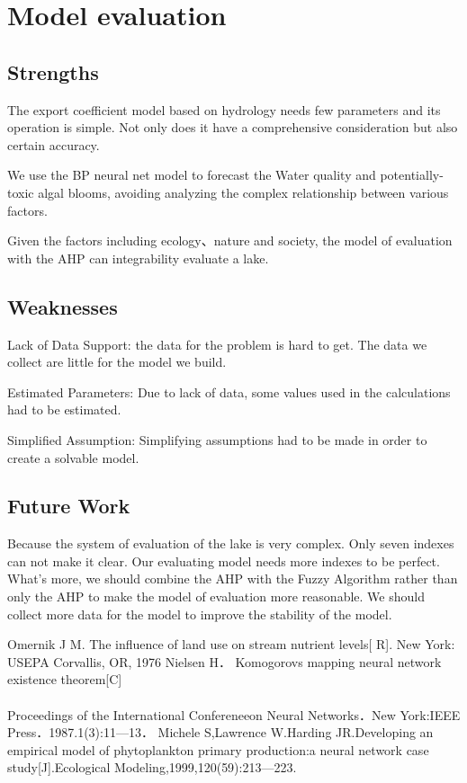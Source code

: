 \documentclass[12pt,a4paper]{article}
\begin{document}
\section{Model evaluation}
\subsection{Strengths}
The export coefficient model based on hydrology needs few parameters and its operation is simple. Not only does it have a comprehensive consideration but also certain accuracy.\par
We use the BP neural net model to forecast the Water quality and potentially-toxic algal blooms, avoiding analyzing the complex relationship between various factors.\par
Given the factors including ecology、nature and society, the model of evaluation with the AHP can integrability evaluate a lake.\par
\subsection{Weaknesses}
Lack of Data Support: the data for the problem is hard to get. The data we collect are little for the model we build.\par
Estimated Parameters: Due to lack of data, some values used in the calculations had to be estimated.\par
Simplified Assumption: Simplifying assumptions had to be made in order to create a solvable model.\par
\subsection{Future Work}
Because the system of evaluation of the lake is very complex. Only seven indexes can not make it clear. Our evaluating model needs more indexes to be perfect. What's more, we should combine the AHP with the Fuzzy Algorithm rather than only the AHP to make the model of evaluation more reasonable. We should collect more data for the model to improve the stability of the model.\par

\newpage
\begin{thebibliography}{99}
     Omernik J M. The influence of land use on stream nutrient levels[ R]. New York: USEPA Corvallis, OR, 1976\label{1}
    Nielsen H． Komogorovs mapping neural network existence theorem[C]\\\\Proceedings of the International Confereneeon Neural Networks．New York:IEEE Press．1987.1(3):11—13．\label{2}
    Michele S,Lawrence W.Harding JR.Developing an empirical model of phytoplankton primary production:a neural network case study[J].Ecological Modeling,1999,120(59):213—223. \label{3}
    
\end{thebibliography}
\end{document}
